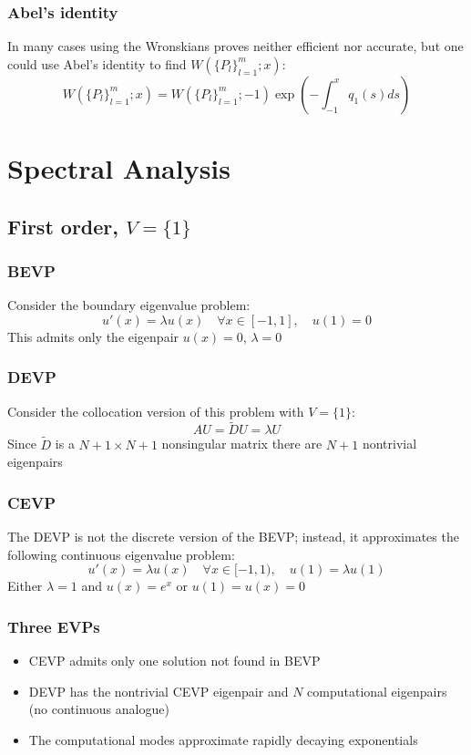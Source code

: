 \documentclass[handout]{beamer}
\begin{document}
\begin{frame}
\frametitle{Abel's identity}
In many cases using the Wronskians proves neither efficient nor accurate,
but one could use Abel's identity to find $W(\{P_l\}_{l=1}^m ; x)$:
\begin{equation*}
W(\{P_l\}_{l=1}^m ; x) = W(\{P_l\}_{l=1}^m ; -1) \exp \left ( - \int_{-1}^x q_1(s) ds \right )
\end{equation*}
\end{frame}

\section{Spectral Analysis}

\subsection{First order, $V = \{1\}$}

\begin{frame}
\frametitle{BEVP}
Consider the boundary eigenvalue problem:
\begin{equation*}
u'(x) = \lambda u(x) \quad \forall x \in [-1,1], \quad u(1) = 0
\end{equation*}
This admits only the eigenpair $u(x) = 0$, $\lambda =0$
\end{frame}

\begin{frame}
\frametitle{DEVP}
Consider the collocation version of this problem with $V = \{1\}$:
\begin{equation*}
A U = \tilde{D} U = \lambda U
\end{equation*}
Since $\tilde{D}$ is a $N+1 \times N+1$ nonsingular matrix there are $N+1$ nontrivial eigenpairs
\end{frame}

\begin{frame}
\frametitle{CEVP}
The DEVP is not the discrete version of the BEVP;
instead, it approximates the following continuous eigenvalue problem:
\begin{equation*}
u'(x) = \lambda u(x) \quad \forall x \in [-1,1), \quad u(1) = \lambda u(1)
\end{equation*}
Either $\lambda = 1$ and $u(x) = e^x$ or $u(1) = u(x) = 0$
\end{frame}

\begin{frame}
\frametitle{Three EVPs}
\begin{itemize}
\item CEVP admits only one solution not found in BEVP
\item DEVP has the nontrivial CEVP eigenpair and $N$ computational eigenpairs (no continuous analogue)
\item The computational modes approximate rapidly decaying exponentials
\end{itemize}
\end{frame}
\end{document}

